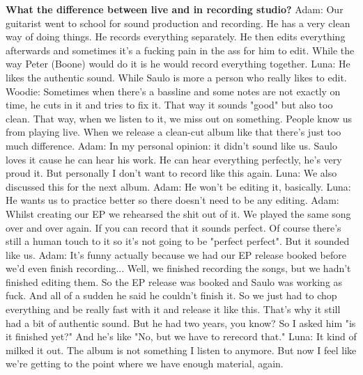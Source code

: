 \textbf{What the difference between live and in recording studio?}
\newline Adam: Our guitarist went to school for sound production and recording. He has a very clean way of doing things. He records everything separately.
He then edits everything afterwards and sometimes it's a fucking pain in the ass for him to edit.
While the way Peter (Boone) would do it is he would record everything together.
\newline Luna: He likes the authentic sound. While Saulo is more a person who really likes to edit.
\newline Woodie: Sometimes when there's a bassline and some notes are not exactly on time, he cuts in it and tries to fix it. That way it sounds "good" but also too clean.
That way, when we listen to it, we miss out on something. People know us from playing live. When we release a clean-cut album like that there's just too much difference.
\newline Adam: In my personal opinion: it didn't sound like us. Saulo loves it cause he can hear his work. He can hear everything perfectly, he's very proud it.
But personally I don't want to record like this again.
\newline Luna: We also discussed this for the next album.
\newline Adam: He won't be editing it, basically.
\newline Luna: He wants us to practice better so there doesn't need to be any editing.
\newline Adam: Whilst creating our EP we rehearsed the shit out of it. We played the same song over and over again. If you can record that it sounds perfect.
Of course there's still a human touch to it so it's not going to be "perfect perfect". But it sounded like us.
\newline Adam: It's funny actually because we had our EP release booked before we'd even finish recording... Well, we finished recording the songs, but we hadn't finished editing them.
So the EP release was booked and Saulo was working as fuck. And all of a sudden he said he couldn't finish it.
So we just had to chop everything and be really fast with it and release it like this. That's why it still had a bit of authentic sound.
But he had two years, you know? So I asked him "is it finished yet?" And he's like "No, but we have to rerecord that."
\newline Luna: It kind of milked it out. The album is not something I listen to anymore. But now I feel like we're getting to the point where we have enough material, again.
